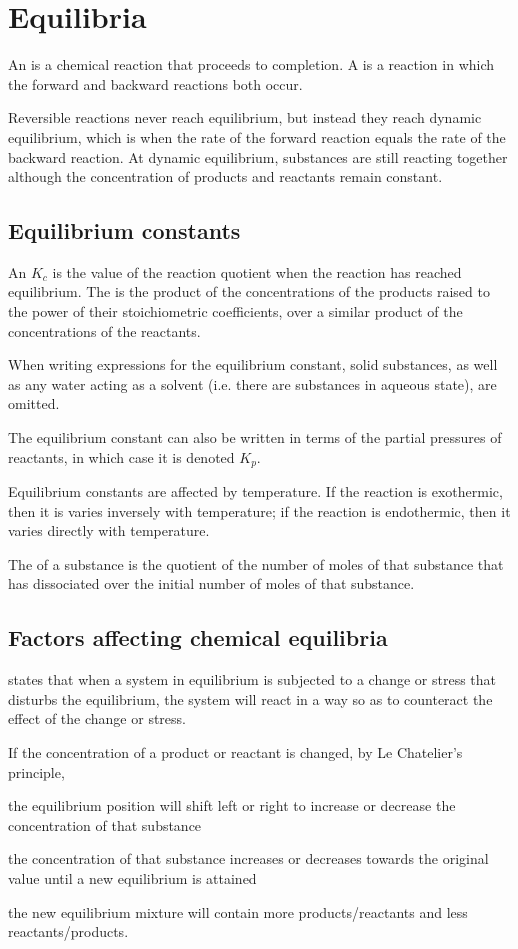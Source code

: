 \documentclass[Chemistry.tex]{subfiles}
\begin{document}
\chapter{Equilibria}
An  is a chemical reaction that proceeds to completion. A  is a reaction in which the forward and backward reactions both occur.

Reversible reactions never reach equilibrium, but instead they reach dynamic equilibrium, which is when the rate of the forward reaction equals the rate of the backward reaction. At dynamic equilibrium, substances are still reacting together although the concentration of products and reactants remain constant.
\section{Equilibrium constants}
An  \(K_c\) is the value of the reaction quotient when the reaction has reached equilibrium. The  is the product of the concentrations of the products raised to the power of their stoichiometric coefficients, over a similar product of the concentrations of the reactants.

When writing expressions for the equilibrium constant, solid substances, as well as any water acting as a solvent (i.e. there are substances in aqueous state), are omitted.

The equilibrium constant can also be written in terms of the partial pressures of reactants, in which case it is denoted \(K_p\).

Equilibrium constants are affected by temperature. If the reaction is exothermic, then it is varies inversely with temperature; if the reaction is endothermic, then it varies directly with temperature.

The  of a substance is the quotient of the number of moles of that substance that has dissociated over the initial number of moles of that substance.
\section{Factors affecting chemical equilibria}
 states that when a system in equilibrium is subjected to a change or stress that disturbs the equilibrium, the system will react in a way so as to counteract the effect of the change or stress.

If the concentration of a product or reactant is changed, by Le Chatelier's principle, \begin{slinenum}
\item the equilibrium position will shift left or right to increase or decrease the concentration of that substance
\item the concentration of that substance increases or decreases towards the original value until a new equilibrium is attained
\item the new equilibrium mixture will contain more products\slash reactants and less reactants\slash products.
\end{slinenum}
\end{document}
